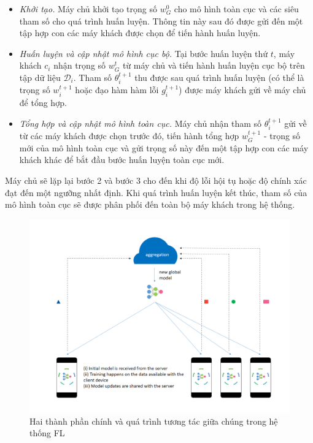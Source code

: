 \begin{itemize}
    \item \textit{Khởi tạo.} Máy chủ khởi tạo trọng số $w_G^0$ cho mô hình toàn cục và các siêu tham số cho quá trình huấn luyện. Thông tin này sau đó được gửi đến một tập hợp con các máy khách được chọn để tiến hành huấn luyện.

    \item \textit{Huấn luyện và cập nhật mô hình cục bộ.} Tại bước huấn luyện thứ $t$, máy khách $c_i$ nhận trọng số $w_G^t$ từ máy chủ và tiến hành huấn luyện cục bộ trên tập dữ liệu $\mathcal{D}_i$. Tham số $\theta_i^{t+1}$ thu được sau quá trình huấn luyện (có thể là trọng số $w_i^{t+1}$ hoặc đạo hàm hàm lỗi $g_i^{t+1}$) được máy khách gửi về máy chủ để tổng hợp.

    \item \textit{Tổng hợp và cập nhật mô hình toàn cục.} Máy chủ nhận tham số $\theta_i^{t+1}$ gửi về từ các máy khách được chọn trước đó, tiến hành tổng hợp $w_G^{t+1}$ - trọng số mới của mô hình toàn cục và gửi trọng số này đến một tập hợp con các máy khách khác để bắt đầu bước huấn luyện toàn cục mới.
\end{itemize}

Máy chủ sẽ lặp lại bước 2 và bước 3 cho đến khi độ lỗi hội tụ hoặc độ chính xác đạt đến một ngưỡng nhất định. Khi quá trình huấn luyện kết thúc, tham số của mô hình toàn cục sẽ được phân phối đến toàn bộ máy khách trong hệ thống.

\begin{figure}
    \begin{center}
        \includegraphics[scale=0.85]{images/fl.png}
        \caption{Hai thành phần chính và quá trình tương tác giữa chúng trong hệ thống FL \cite{chandorikar_2020}}
        \label{fig:fl}
    \end{center}
\end{figure}


